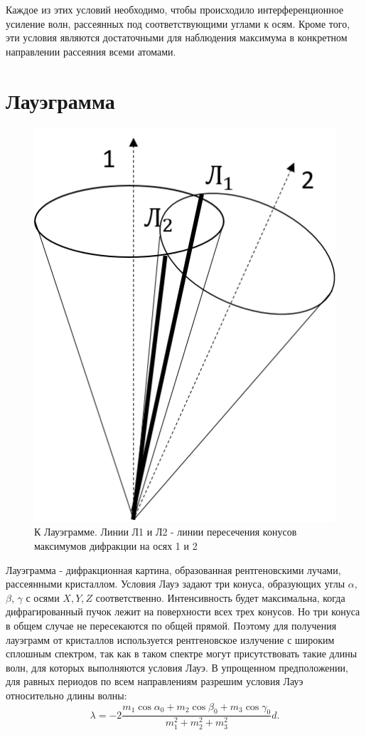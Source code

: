 \documentclass[12pt]{kiarticle} %
\begin{document}
Каждое из этих условий необходимо, чтобы происходило интерференционное усиление волн, рассеянных под соответствующими углами к осям. Кроме того, эти условия являются достаточными для наблюдения максимума в конкретном направлении рассеяния всеми атомами. 

\section{Лауэграмма}
\begin{figure}
    \centering
    \vspace{-30pt}
	\includegraphics[width=\linewidth]{pic4.png}
	\caption{К Лауэграмме. Линии Л1 и Л2 - линии пересечения конусов максимумов дифракции на осях 1 и 2}
	\label{ris 3}
\end{figure}
Лауэграмма - дифракционная картина, образованная рентгеновскими лучами, рассеянными кристаллом.
Условия Лауэ задают три конуса, образующих углы $\alpha$, $\beta$, $\gamma$ с осями $X, Y, Z$ соответственно. Интенсивность будет максимальна, когда дифрагированный пучок лежит на поверхности всех трех конусов. Но три конуса в общем случае не пересекаются по общей прямой. Поэтому для получения лауэграмм от кристаллов используется рентгеновское излучение с широким сплошным спектром, так как в таком спектре могут присутствовать такие длины волн, для которых выполняются условия Лауэ. В упрощенном предположении, для равных периодов по всем направлениям разрешим условия Лауэ относительно длины волны:
\[ \lambda = -2 \frac{m_1 \cos \alpha_0 + m_2 \cos \beta_0 + m_3 \cos \gamma_0}{m_1^2 + m_2^2 + m_3^2} d. \]
\end{document}
